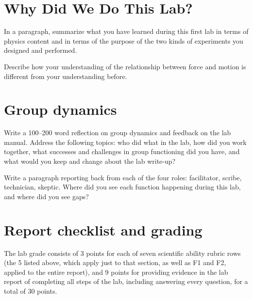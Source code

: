 \section{Why Did We Do This Lab?}

\begin{steps}
	\item In a paragraph, summarize what you have learned during this first lab in terms of physics content and in terms of the purpose of the two kinds of experiments you designed and performed.
	
	\item Describe how your understanding of the relationship between force and motion is different from your understanding before.
\end{steps}

\section{Group dynamics}

\begin{steps}
	\item Write a 100--200 word reflection on group dynamics and feedback on the lab manual. Address the following topics: who did what in the lab, how did you work together, what successes and challenges in group functioning did you have, and what would you keep and change about the lab write-up?
	
	\item Write a paragraph reporting back from each of the four roles: facilitator, scribe, technician, skeptic. Where did you see each function happening during this lab, and where did you see gaps?
\end{steps}

\section{Report checklist and grading}

The lab grade consists of 3 points for each of seven scientific ability rubric rows (the 5 listed above, which apply just to that section, as well as F1 and F2, applied to the entire report), and 9 points for providing evidence in the lab report of completing all steps of the lab, including answering every question, for a total of 30 points.